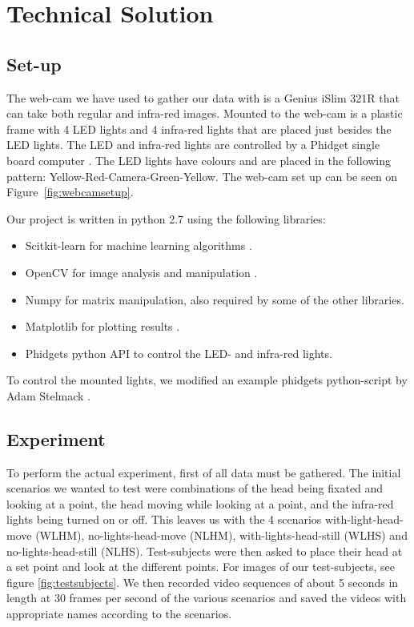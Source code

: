 \section{Technical Solution}
\label{sec:TechnicalSolution}
\subsection{Set-up}
\label{sub:Set-up}
The web-cam we have used to gather our data with is a Genius iSlim 321R that can take both regular and infra-red images.
Mounted to the web-cam is a plastic frame with 4 LED lights and 4 infra-red lights that are placed just besides the LED lights.
The LED and infra-red lights are controlled by a Phidget single board computer \cite{phidgets2012website}.
The LED lights have colours and are placed in the following pattern: Yellow-Red-Camera-Green-Yellow.
The web-cam set up can be seen on Figure~\ref{fig:webcamsetup}.

Our project is written in python 2.7 using the following libraries: 
\begin{itemize} %
\item{Scitkit-learn for machine learning algorithms \cite{scikitlearn2012website}.}
\item{OpenCV for image analysis and manipulation \cite{opencv2012website}.}
\item{Numpy for matrix manipulation, also required by some of the other libraries\cite{scipy2012website}.}
\item{Matplotlib for plotting results \cite{matplotlib2012website}.}
\item{Phidgets python API to control the LED- and infra-red lights.}
\end{itemize}

To control the mounted lights, we modified an example phidgets python-script by Adam Stelmack \cite{phidgetexample2012download}.

\subsection{Experiment}
\label{sub:Experiment}
To perform the actual experiment, first of all data must be gathered.
The initial scenarios we wanted to test were combinations of the head being fixated and looking at a point, the head moving while looking at a point, and the infra-red lights being turned on or off.
This leaves us with the 4 scenarios with-light-head-move (WLHM), no-lights-head-move (NLHM), with-lights-head-still (WLHS) and no-lights-head-still (NLHS).
Test-subjects were then asked to place their head at a set point and look at the different points. For images of our test-subjects, see figure \ref{fig:testsubjects}.%
We then recorded video sequences of about 5 seconds in length at 30 frames per second of the various scenarios and saved the videos with appropriate names according to the scenarios.

